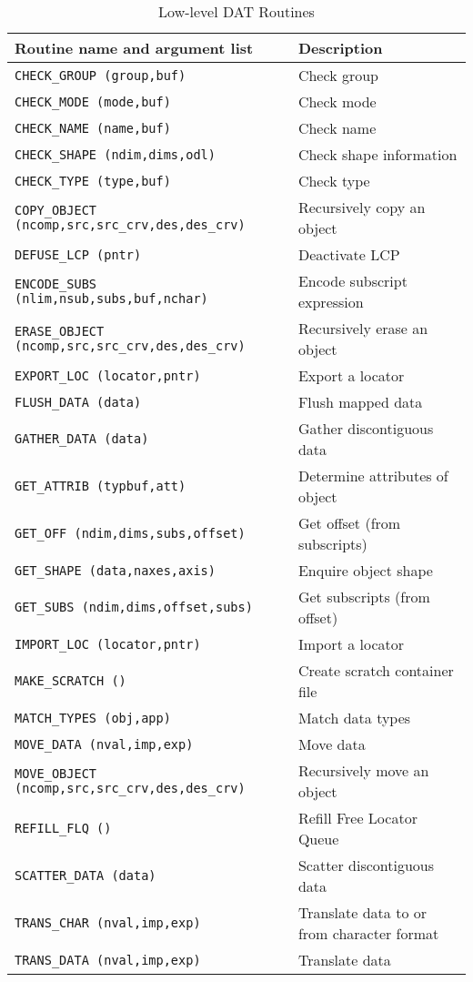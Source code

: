 \begin {table}[htbp]
\begin {center}
\begin {tabular}{||l|l||}
\hline
Routine name and argument list			& Description \\
\hline
{\tt CHECK\_GROUP (group,buf)}			& Check group  \\
{\tt CHECK\_MODE (mode,buf)}			& Check mode  \\
{\tt CHECK\_NAME (name,buf)}			& Check name  \\
{\tt CHECK\_SHAPE (ndim,dims,odl)}		& Check shape information \\
{\tt CHECK\_TYPE (type,buf)}			& Check type  \\
{\tt COPY\_OBJECT (ncomp,src,src\_crv,des,des\_crv)} & Recursively copy an object \\
{\tt DEFUSE\_LCP (pntr)}	       		& Deactivate LCP  \\
{\tt ENCODE\_SUBS (nlim,nsub,subs,buf,nchar)}	& Encode subscript expression \\
{\tt ERASE\_OBJECT  (ncomp,src,src\_crv,des,des\_crv)} & Recursively erase an object \\
{\tt EXPORT\_LOC (locator,pntr)}		& Export a locator \\
{\tt FLUSH\_DATA (data)}			& Flush mapped data  \\
{\tt GATHER\_DATA (data)}			& Gather discontiguous data \\
{\tt GET\_ATTRIB (typbuf,att)}			& Determine attributes of object \\
{\tt GET\_OFF (ndim,dims,subs,offset)}		& Get offset (from subscripts) \\
{\tt GET\_SHAPE (data,naxes,axis)}		& Enquire object shape \\
{\tt GET\_SUBS (ndim,dims,offset,subs)}		& Get subscripts (from offset) \\
{\tt IMPORT\_LOC (locator,pntr)}		& Import a locator \\
{\tt MAKE\_SCRATCH ()}				& Create scratch container file \\
{\tt MATCH\_TYPES (obj,app)}			& Match data types \\
{\tt MOVE\_DATA (nval,imp,exp)}			& Move data \\
{\tt MOVE\_OBJECT (ncomp,src,src\_crv,des,des\_crv)} & Recursively move an object \\
{\tt REFILL\_FLQ ()}				& Refill Free Locator Queue  \\
{\tt SCATTER\_DATA (data)}			& Scatter discontiguous data \\
{\tt TRANS\_CHAR (nval,imp,exp)}		& Translate data to or from character format \\
{\tt TRANS\_DATA (nval,imp,exp)}		& Translate data \\
\hline                                                         
\end {tabular}
\caption {Low-level DAT Routines}
\label {low_level_dat_routines}
\end {center}
\end {table}

